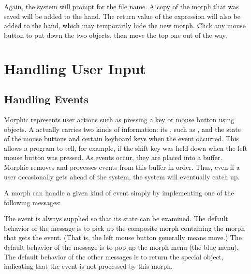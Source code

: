 \documentclass[letterpaper,10pt,english]{sphinxmanual}
\begin{document}
Again, the system will prompt for the file name. A copy of the morph that was saved will be added to the hand. The return value of the expression will also be added to the hand, which may temporarily hide the new morph. Click any mouse button to put down the two objects, then move the top one out of the way.


\section{Handling User Input}
\label{\detokenize{morphic:handling-user-input}}

\subsection{Handling Events}
\label{\detokenize{morphic:handling-events}}
Morphic represents user actions such as pressing a key or mouse button using  objects. A  actually carries two kinds of information: its , such as , and the state of the mouse buttons and certain keyboard keys when the event occurred. This allows a program to tell, for example, if the shift key was held down when the left mouse button was pressed. As events occur, they are placed into a buffer. Morphic removes and processes events from this buffer in order. Thus, even if a user occasionally gets ahead of the system, the system will eventually catch up.

A morph can handle a given kind of event simply by implementing one of the following messages:

\begin{sphinxVerbatim}[commandchars=\\\{\}]
 
 
 
 
 
 
 
 
 
 
 
 
\end{sphinxVerbatim}

The event is always supplied so that its state can be examined. The default behavior of the  message is to pick up the composite morph containing the morph that gets the event. (That is, the left mouse button generally means \sphinxquotedblleft{}move\sphinxquotedblright{}.) The default behavior of the  message is to pop up the morph menu (the \sphinxquotedblleft{}blue\sphinxquotedblright{} menu). The default behavior of the other messages is to return the special  object, indicating that the event is not processed by this morph.
\end{document}
